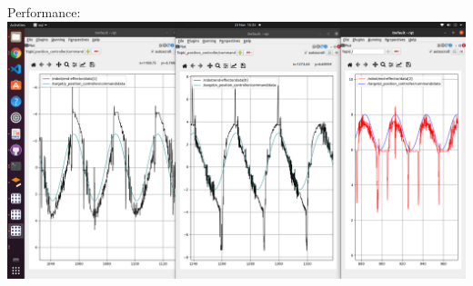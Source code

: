 \documentclass[12pt]{article}
\begin{document}
\begin{landscape}
\newpage
Performance:\\
\includegraphics[width=\textwidth]{closed_control_accuracy.png}
\end{landscape}
\end{document}
